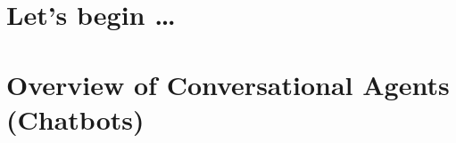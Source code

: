 \section[Start]{Let's begin \ldots}


\section[Overview]{Overview of Conversational Agents (Chatbots)}


% 
% 

% 
% 

% 
% 



% 

% 
% 
% 
% 
% 
% 
% 


% 

% 
% 